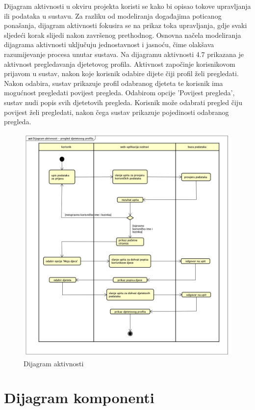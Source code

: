 		Dijagram aktivnosti u okviru projekta koristi se kako bi opisao tokove upravljanja ili podataka u sustavu. 
		Za razliku od modeliranja događajima poticanog ponašanja, dijagram aktivnosti fokusira se na prikaz toka upravljanja, 
		gdje svaki sljedeći korak slijedi nakon završenog prethodnog. Osnovna načela modeliranja dijagrama aktivnosti uključuju 
		jednostavnost i jasnoću, čime olakšava razumijevanje procesa unutar sustava.
		Na dijagramu aktivnosti 4.7 prikazana je 
		aktivnost pregledavanja djetetovog profila. Aktivnost započinje korisnikovom prijavom u sustav, nakon koje korisnik odabire 
		dijete čiji profil želi pregledati. Nakon odabira, sustav prikazuje profil odabranog djeteta te korisnik ima mogućnost pregledati 
		povijest pregleda. Odabirom opcije 'Povijest pregleda', sustav nudi popis svih djetetovih pregleda. Korisnik može odabrati 
		pregled čiju povijest želi pregledati, nakon čega sustav prikazuje pojedinosti odabranog pregleda. 
 
			\begin{figure}[H]
				\includegraphics[width=\textwidth]{slike/DijagramAktivnosti.png} 
				\caption{Dijagram aktivnosti} 
		    \end{figure}
			\eject

		\section{Dijagram komponenti}
		
